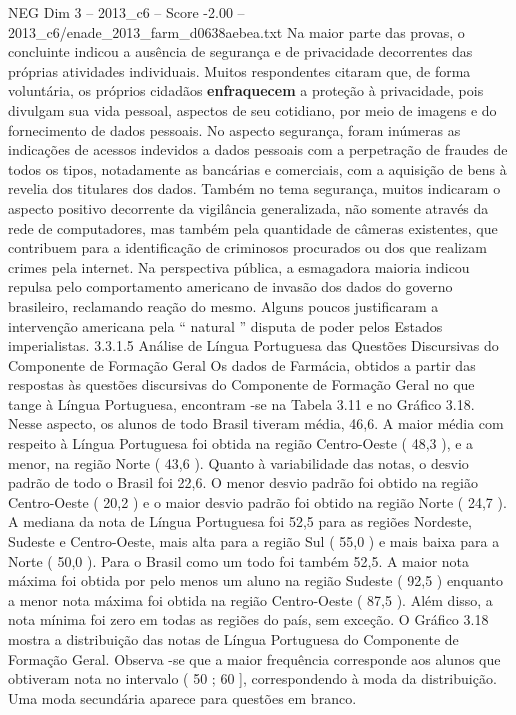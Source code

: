 \begin{textsample}{NEG Dim 3 – 2013\_c6 – Score -2.00 – 2013\_c6/enade\_2013\_farm\_d0638aebea.txt}
Na maior parte das provas, o concluinte indicou a ausência de segurança e de privacidade decorrentes das próprias atividades individuais.
Muitos respondentes citaram que, de forma voluntária, os próprios cidadãos \textbf{enfraquecem} a proteção à privacidade, pois divulgam sua vida pessoal, aspectos de seu cotidiano, por meio de imagens e do fornecimento de dados pessoais.
No aspecto segurança, foram inúmeras as indicações de acessos indevidos a dados pessoais com a perpetração de fraudes de todos os tipos, notadamente as bancárias e comerciais, com a aquisição de bens à revelia dos titulares dos dados.
Também no tema segurança, muitos indicaram o aspecto positivo decorrente da vigilância generalizada, não somente através da rede de computadores, mas também pela quantidade de câmeras existentes, que contribuem para a identificação de criminosos procurados ou dos que realizam crimes pela internet.
Na perspectiva pública, a esmagadora maioria indicou repulsa pelo comportamento americano de invasão dos dados do governo brasileiro, reclamando reação do mesmo.
Alguns poucos justificaram a intervenção americana pela “ natural ” disputa de poder pelos Estados imperialistas. 3.3.1.5 Análise de Língua Portuguesa das Questões Discursivas do Componente de Formação Geral Os dados de Farmácia, obtidos a partir das respostas às questões discursivas do Componente de Formação Geral no que tange à Língua Portuguesa, encontram -se na Tabela 3.11 e no Gráfico 3.18.
Nesse aspecto, os alunos de todo Brasil tiveram média, 46,6.
A maior média com respeito à Língua Portuguesa foi obtida na região Centro-Oeste ( 48,3 ), e a menor, na região Norte ( 43,6 ).
Quanto à variabilidade das notas, o desvio padrão de todo o Brasil foi 22,6.
O menor desvio padrão foi obtido na região Centro-Oeste ( 20,2 ) e o maior desvio padrão foi obtido na região Norte ( 24,7 ).
A mediana da nota de Língua Portuguesa foi 52,5 para as regiões Nordeste, Sudeste e Centro-Oeste, mais alta para a região Sul ( 55,0 ) e mais baixa para a Norte ( 50,0 ).
Para o Brasil como um todo foi também 52,5.
A maior nota máxima foi obtida por pelo menos um aluno na região Sudeste ( 92,5 ) enquanto a menor nota máxima foi obtida na região Centro-Oeste ( 87,5 ).
Além disso, a nota mínima foi zero em todas as regiões do país, sem exceção.
O Gráfico 3.18 mostra a distribuição das notas de Língua Portuguesa do Componente de Formação Geral.
Observa -se que a maior frequência corresponde aos alunos que obtiveram nota no intervalo ( 50 ; 60 ], correspondendo à moda da distribuição.
Uma moda secundária aparece para questões em branco.

\end{textsample}
